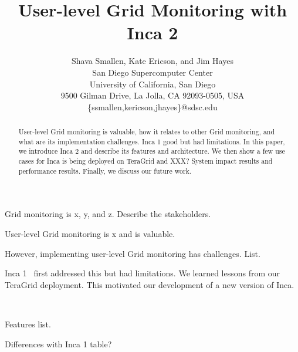 \documentclass[times, 10pt,twocolumn]{article}
\begin{document}
\title{User-level Grid Monitoring with Inca 2}

\author{Shava Smallen, Kate Ericson, and Jim Hayes \\
San Diego Supercomputer Center\\ University of California, San Diego\\ 
9500 Gilman Drive, La Jolla, CA 92093-0505, USA\\ 
\{ssmallen,kericson,jhayes\}@sdsc.edu\\
}

\maketitle
\thispagestyle{empty}


\begin{abstract}
User-level Grid monitoring is valuable, how it relates to other Grid
monitoring,  and what are its implementation challenges.
Inca 1 good but had limitations.  In this paper, we introduce Inca 2 and
describe its features and architecture.  We then show a few use cases for Inca
is being deployed on TeraGrid and XXX?  System impact results and performance
results.  Finally, we discuss our future work.  
\end{abstract}


Grid monitoring is x, y, and z.  Describe the stakeholders.

User-level Grid monitoring is x and is valuable.  

However, implementing user-level Grid monitoring has challenges.  List.

Inca 1~\cite{inca1} first addressed this but had limitations.  We learned
lessons from our TeraGrid deployment.  This motivated our development of a new
version of Inca.

~\newpage
~\newpage
~\newpage
~\newpage


Features list.

Differences with Inca 1 table? 
\end{document}

